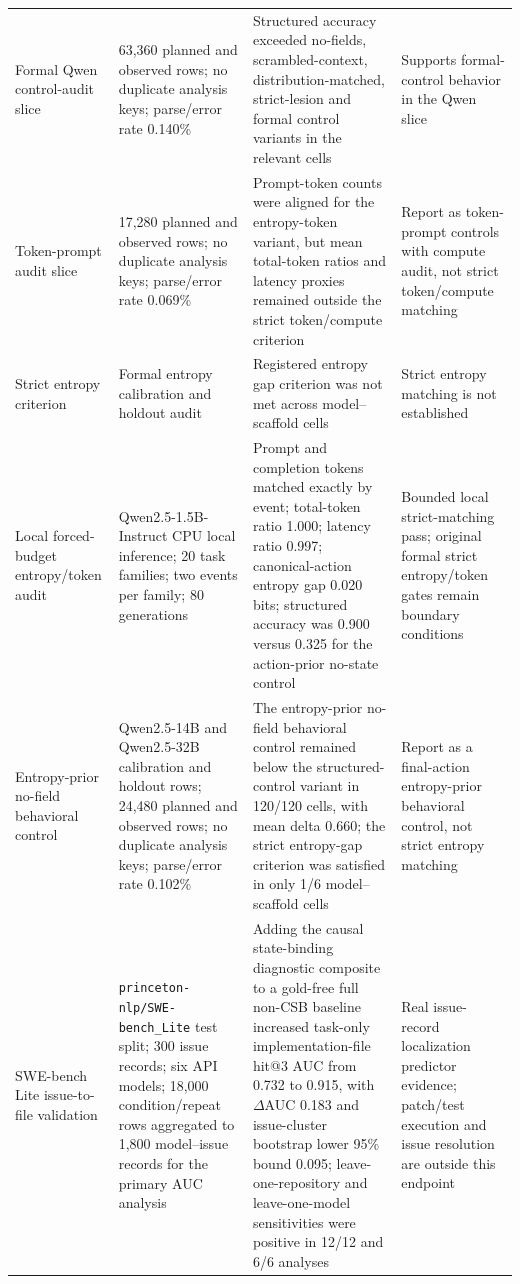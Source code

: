 \documentclass[11pt]{article}
\begin{document}
\begin{longtable}{p{}p{}p{}p{}}
Formal Qwen control-audit slice & 63,360 planned and observed rows; no duplicate analysis keys; parse/error rate 0.140\% & Structured accuracy exceeded no-fields, scrambled-context, distribution-matched, strict-lesion and formal control variants in the relevant cells & Supports formal-control behavior in the Qwen slice \\
Token-prompt audit slice & 17,280 planned and observed rows; no duplicate analysis keys; parse/error rate 0.069\% & Prompt-token counts were aligned for the entropy-token variant, but mean total-token ratios and latency proxies remained outside the strict token/compute criterion & Report as token-prompt controls with compute audit, not strict token/compute matching \\
Strict entropy criterion & Formal entropy calibration and holdout audit & Registered entropy gap criterion was not met across model--scaffold cells & Strict entropy matching is not established \\
Local forced-budget entropy/token audit & Qwen2.5-1.5B-Instruct CPU local inference; 20 task families; two events per family; 80 generations & Prompt and completion tokens matched exactly by event; total-token ratio 1.000; latency ratio 0.997; canonical-action entropy gap 0.020 bits; structured accuracy was 0.900 versus 0.325 for the action-prior no-state control & Bounded local strict-matching pass; original formal strict entropy/token gates remain boundary conditions \\
Entropy-prior no-field behavioral control & Qwen2.5-14B and Qwen2.5-32B calibration and holdout rows; 24,480 planned and observed rows; no duplicate analysis keys; parse/error rate 0.102\% & The entropy-prior no-field behavioral control remained below the structured-control variant in 120/120 cells, with mean delta 0.660; the strict entropy-gap criterion was satisfied in only 1/6 model--scaffold cells & Report as a final-action entropy-prior behavioral control, not strict entropy matching \\
SWE-bench Lite issue-to-file validation & \texttt{princeton-nlp/SWE-bench\_Lite} test split; 300 issue records; six API models; 18,000 condition/repeat rows aggregated to 1,800 model--issue records for the primary AUC analysis & Adding the causal state-binding diagnostic composite to a gold-free full non-CSB baseline increased task-only implementation-file hit@3 AUC from 0.732 to 0.915, with \(\Delta\)AUC 0.183 and issue-cluster bootstrap lower 95\% bound 0.095; leave-one-repository and leave-one-model sensitivities were positive in 12/12 and 6/6 analyses & Real issue-record localization predictor evidence; patch/test execution and issue resolution are outside this endpoint \\

\end{longtable}
\end{document}
